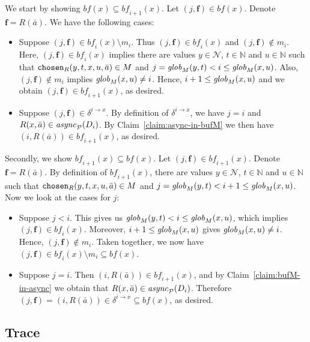 \documentclass{tlp}
\newcommand{\Nat}{\mathbb{N}}  \newcommand{\len}[1]{|#1|} \newcommand{\rom}[1]{\text{\emph{(#1)}}} \newcommand{\romI}{\rom i}
\newcommand{\ded}{\mathcal{P}}
\newcommand{\fc}{\boldsymbol{f}}
\newcommand{\nw}{\mathcal{N}}
\newcommand{\chosen}{\pred{chosen}}
\newcommand{\cnfb}{\mathit{bf}}
\newcommand{\pair}[2]{(#1,#2)}
\newcommand{\sendto}[2]{\delta^{#1\to#2}}
\newcommand{\async}[1]{\fname{async}_{#1}}
\newcommand{\mstep}[1]{(#1)}
\newcommand{\globM}[1]{\fname{glob}_{M}(#1)}
\begin{document}
\begin{appendix}
We start by showing $\cnfb(x)\subseteq\cnfb_{i+1}(x)$. Let $\pair j{\fc}\in\cnfb(x)$.
Denote $\fc=R(\bar{a})$. We have the following cases:
\begin{itemize}
\item Suppose $\pair j{\fc}\in\cnfb_{i}(x)\setminus m_{i}$. Thus $\pair j{\fc}\in\cnfb_{i}(x)$
and $\pair j{\fc}\notin m_{i}$. Here, $\pair j{\fc}\in\cnfb_{i}(x)$
implies there are values $y\in\nw$, $t\in\Nat$ and $u\in\Nat$ such
that $\chosen_{R}(y,t,x,u,\bar{a})\in M$ and $j=\globM{y,t}<i\leq\globM{x,u}$.
Also, $\pair j{\fc}\notin m_{i}$ implies $\globM{x,u}\neq i$. Hence,
$i+1\leq\globM{x,u}$ and we obtain $\pair j{\fc}\in\cnfb_{i+1}(x)$,
as desired.
\item Suppose $\pair j{\fc}\in\sendto ix$. By definition of $\sendto ix$,
we have $j=i$ and $R(x,\bar{a})\in\async{\ded}\mstep{D_{i}}$. By
Claim~\ref{claim:async-in-bufM} we then have $\pair i{R(\bar{a})}\in\cnfb_{i+1}(x)$,
as desired.
\end{itemize}
Secondly, we show $\cnfb_{i+1}(x)\subseteq\cnfb(x)$. Let $\pair j{\fc}\in\cnfb_{i+1}(x)$.
Denote $\fc=R(\bar{a})$. By definition of $\cnfb_{i+1}(x)$, there
are values $y\in\nw$, $t\in\Nat$ and $u\in\Nat$ such that $\chosen_{R}(y,t,x,u,\bar{a})\in M$
and $j=\globM{y,t}<i+1\leq\globM{x,u}$. Now we look at the cases
for $j$:
\begin{itemize}
\item Suppose $j<i$. This gives us $\globM{y,t}<i\leq\globM{x,u}$, which
implies $\pair j{\fc}\in\cnfb_{i}(x)$. Moreover, $i+1\leq\globM{x,u}$
gives $\globM{x,u}\neq i$. Hence, $\pair j{\fc}\notin m_{i}$. Taken
together, we now have $\pair j{\fc}\in\cnfb_{i}(x)\setminus m_{i}\subseteq\cnfb(x)$.
\item Suppose $j=i$. Then $\pair i{R(\bar{a})}\in\cnfb_{i+1}(x)$, and
by Claim~\ref{claim:bufM-in-async} we obtain that $R(x,\bar{a})\in\async{\ded}\mstep{D_{i}}$.
Therefore $\pair j{\fc}=\pair i{R(\bar{a})}\in\sendto ix\subseteq\cnfb(x)$,
as desired.
\end{itemize}

\subsection{Trace}

\label{sub:model-to-run--trace}


\end{appendix}
\end{document}

